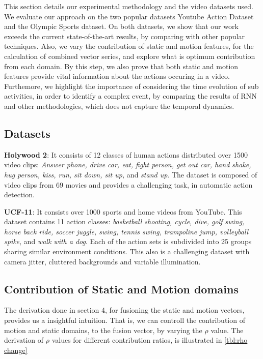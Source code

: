 This section details our experimental methodology and the  video  datasets used. We evaluate our approach on the two popular datasets
Youtube Action Dataset and the Olympic Sports dataset. On both datasets, we show that our work exceeds the current state-of-the-art
results, by comparing with other popular techniques. Also, we vary the contribution of static and motion features, for the calculation
of combined vector series, and explore what is optimum contribution from each domain. By this step, we also prove that both static and motion features
provide vital information about the actions occuring in a video. Furthemore, we highlight the importance of considering the time evolution
of sub activities, in order to identify a complex event, by comparing the results of RNN and other methodologies, which does not capture
the temporal dynamics. 

\subsection{Datasets}
\noindent
\textbf{Holywood 2}: It consists of 12 classes of human actions distributed over 1500 video clips:
\textit{Answer phone, drive car, eat, fight person, get out car, hand shake, 
hug person, kiss, run, sit down, sit up, }and \textit{stand up}.
The dataset is composed of video clips from 69 movies and provides a challenging task, in automatic action detection.

\noindent
\textbf{UCF-11}: It consists over 1000
sports and home videos from YouTube. This dataset contains 11 action classes: 
\textit{basketball shooting, cycle, dive, golf swing, horse
back ride, soccer juggle, swing, tennis swing, trampoline
jump, volleyball spike}, and \textit{walk with a dog}. Each of the action 
sets is subdivided into 25 groups sharing similar environment conditions. 
This also is a challenging dataset with
camera jitter, cluttered backgrounds and variable illumination. 


\subsection{Contribution of Static and Motion domains}

The derivation done in section 4, for fusioning the static and motion vectors,
provides us a insightful intuition. That is, we can controll the contribution
of motion and static domains, to the fusion vector, by varying the $\rho$ value. 
The derivation of $\rho$ values for different contribution ratios, is illustrated in 
\ref{tbl:rho change}

